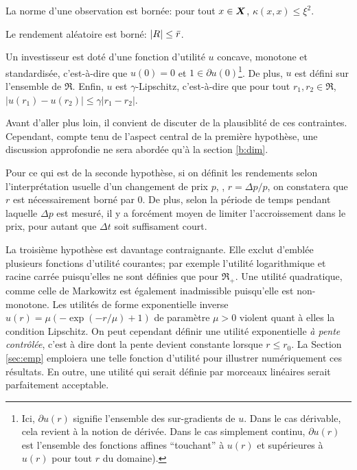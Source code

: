 \begin{assumption}
  La norme d'une observation est bornée: pour tout $x \in \bm{X}$, $\kappa(x,x) \leq \xi^2$.
\end{assumption}
\begin{assumption}
  Le rendement aléatoire est borné: $|R| \leq \bar r$.
\end{assumption}
\begin{assumption}
  \label{hyp:lip}
  Un investisseur est doté d'une fonction d'utilité $u$ concave, monotone et standardisée,
  c'est-à-dire que $u(0) = 0$ et $1 \in \partial u(0)$\footnote{Ici, $\partial u(r)$ signifie l'ensemble
    des sur-gradients de $u$. Dans le cas dérivable, cela revient à la notion de
    dérivée. Dans le cas simplement continu, $\partial u(r)$ est l'ensemble des fonctions affines
    ``touchant'' à $u(r)$ et supérieures à $u(r)$ pour tout $r$ du domaine).}. De plus,
  $u$ est défini sur l'ensemble de $\Re$. Enfin, $u$ est $\gamma$-Lipschitz, c'est-à-dire que
  pour tout $r_1,r_2 \in \Re$, $|u(r_1) - u(r_2)| \leq \gamma|r_1-r_2|$.
\end{assumption}

Avant d'aller plus loin, il convient de discuter de la plausiblité de ces
contraintes. Cependant, compte tenu de l'aspect central de la première hypothèse, une
discussion approfondie ne sera abordée qu'à la section \ref{b:dim}.

Pour ce qui est de la seconde hypothèse, si on définit les rendements selon
l'interprétation usuelle d'un changement de prix $p$, \ie, $r = \Delta p/p$, on constatera que
$r$ est nécessairement borné par 0. De plus, selon la période de temps pendant laquelle
$\Delta p$ est mesuré, il y a forcément moyen de limiter l'accroissement dans le prix, pour
autant que $\Delta t$ soit suffisament court.

La troisième hypothèse est davantage contraignante. Elle exclut d'emblée plusieurs
fonctions d'utilité courantes; par exemple l'utilité logarithmique et racine carrée
puisqu'elles ne sont définies que pour $\Re_{+}$. Une utilité quadratique, comme celle de
Markowitz est également inadmissible puisqu'elle est non-monotone. Les utilités de forme
exponentielle inverse $u(r) = \mu(-\exp(-r/\mu)+1)$ de paramètre $\mu > 0$ violent quant à elles
la condition Lipschitz. On peut cependant définir une utilité exponentielle \textit{à
  pente contrôlée}, c'est à dire dont la pente devient constante lorsque $r \leq r_0$. La
Section \ref{sec:emp} emploiera une telle fonction d'utilité pour illustrer numériquement
ces résultats. En outre, une utilité qui serait définie par morceaux linéaires serait
parfaitement acceptable. 


